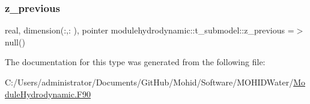 \mbox{\label{structmodulehydrodynamic_1_1t__submodel_a38c8d2095dab0a8276c95fd16b6cfacf}} 
\subsubsection{\texorpdfstring{z\+\_\+previous}{z\_previous}}
{\footnotesize\ttfamily real, dimension(\+:,\+:  ), pointer modulehydrodynamic\+::t\+\_\+submodel\+::z\+\_\+previous =$>$ null()\hspace{0.3cm}{\ttfamily [private]}}



The documentation for this type was generated from the following file\+:\begin{DoxyCompactItemize}
\item 
C\+:/\+Users/administrator/\+Documents/\+Git\+Hub/\+Mohid/\+Software/\+M\+O\+H\+I\+D\+Water/\mbox{\hyperlink{_module_hydrodynamic_8_f90}{Module\+Hydrodynamic.\+F90}}\end{DoxyCompactItemize}
